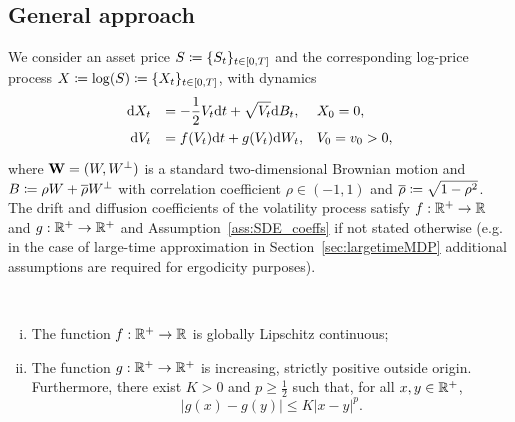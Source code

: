\subsection{General approach}
We consider an asset price $S\coloneqq \{S_t\}_{t\in[0,T]}$ and the corresponding log-price process $X\coloneqq\log(S) \coloneqq \{X_t\}_{t\in[0,T]}$, with dynamics
\begin{equation}\label{eq:log_price_dyn}
\begin{array}{rll}
\def\arraystretch{1.5}
\D X_t & = \displaystyle -\frac{1}{2}V_t \D t + \sqrt{V_t} \D B_t, & X_0 = 0, \\
\D V_t & = f(V_t)\D t + g(V_t)\D W_t, & V_0 = v_0>0,
\end{array}
\end{equation}
where $\boldsymbol{\mathrm{W}} = (W,W^{\perp})$ is a standard two-dimensional Brownian motion and $B\coloneqq \rho W + \overline{\rho}W^{\perp}$ with correlation coefficient $\rho \in (-1,1)$ and $\overline{\rho}\coloneqq \sqrt{1-\rho^2}$. 
The drift and diffusion coefficients of the volatility process satisfy  $f:\mathbb{R}^+\rightarrow\mathbb{R}$ and $g:\mathbb{R}^+\rightarrow\mathbb{R}^+$ and Assumption~\ref{ass:SDE_coeffs} if not stated otherwise (e.g. in the case of large-time approximation in Section~\ref{sec:largetimeMDP} additional assumptions are required for ergodicity purposes). 
\begin{assumption}\label{ass:SDE_coeffs}\
\begin{enumerate}[(i)]
\item The function $f:\mathbb{R}^+\rightarrow\mathbb{R}$ is globally Lipschitz continuous;
\item The function $g:\mathbb{R}^+\rightarrow \mathbb{R}^+$ is increasing, strictly positive outside origin.
Furthermore, there exist $K>0$ and $p\geq\frac12$ such that, for all $x,y\in\mathbb{R}^+$,
\[
\left|g(x)-g(y)\right|\leq K |x-y|^p.
\]
\end{enumerate}
\end{assumption}
